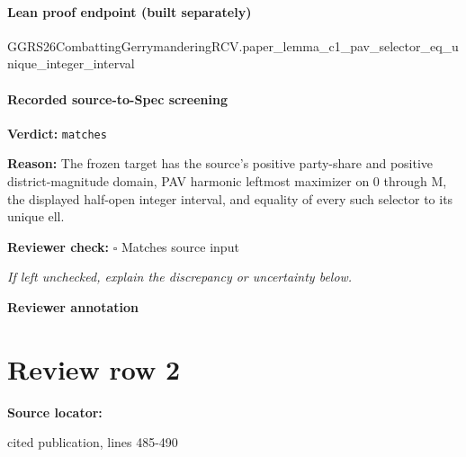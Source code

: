 \documentclass[10pt]{article}
\newcommand{\reviewerbox}{%
  \par\noindent\fbox{\parbox{0.96\linewidth}{\rule{0pt}{0.38in}}}\par
}
\newcommand{\reviewmatch}[1]{%
  \par\noindent\textbf{Reviewer check:} $\square$\; #1\par
  \noindent\emph{If left unchecked, explain the discrepancy or uncertainty below.}\par
}
\begin{document}
\paragraph{Lean proof endpoint (built separately)}\begin{ReviewVerbatim}
GGRS26CombattingGerrymanderingRCV.paper_lemma_c1_pav_selector_eq_unique_integer_interval
\end{ReviewVerbatim}

\paragraph{Recorded source-to-Spec screening}
\textbf{Verdict:} \texttt{matches}
\\
{\raggedright
\textbf{Reason:} The frozen target has the source's positive party-\allowbreak{}share and positive district-\allowbreak{}magnitude domain, PAV harmonic leftmost maximizer on 0 through M, the displayed half-\allowbreak{}open integer interval, and equality of every such selector to its unique ell.\allowbreak{}
\par}
\reviewmatch{Matches source input}
\noindent\textbf{Reviewer annotation}\par
\reviewerbox
\clearpage
\hypertarget{source-claim-1d81d5a90a327c0b}{}
\section*{Review row 2}
\textbf{Source locator:} {\footnotesize\raggedright cited publication, lines 485-\allowbreak{}490\par}
\end{document}
